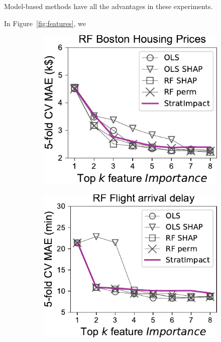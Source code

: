 \documentclass[11pt]{article}
\newcommand{\figref}[1]{Figure~\ref{#1}}
\begin{document}
Model-based methods have all the advantages in these experiments.

In \figref{fig:features}, we



\begin{figure}
\centering
\begin{subfigure}{.245\textwidth}
    \centering
\includegraphics[scale=0.45]{images/boston-topk-RF-Importance.pdf}
\end{subfigure}%
\hfill
\begin{subfigure}{.245\textwidth}
    \centering
\includegraphics[scale=0.45]{images/flights-topk-RF-Importance.pdf}

\end{subfigure}
\end{figure}
\end{document}
